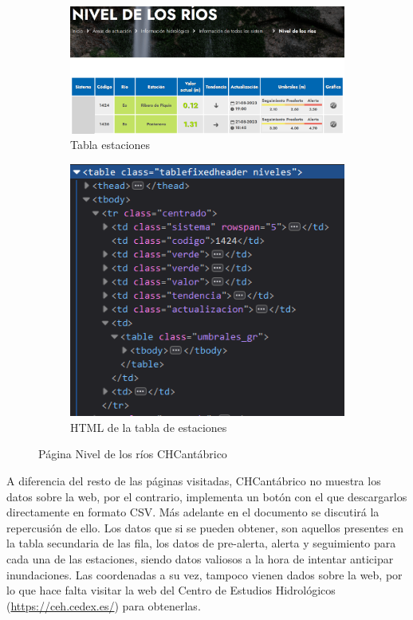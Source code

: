 \begin{figure} [H]
	\centering
	\begin{subfigure}{.5\textwidth}
		\centering
		\includegraphics[width=.7\linewidth]{fig/CHCantabricoCode.png}
		\caption{Tabla estaciones}
		\label{fig:sub9}
	\end{subfigure}%
	\begin{subfigure}{.5\textwidth}
		\centering
		\includegraphics[width=.7\linewidth]{fig/CHCantabricoCodeHTML.png}
		\caption{HTML de la tabla de estaciones}
		\label{fig:sub10}
	\end{subfigure}
	\caption{Página Nivel de los ríos CHCantábrico}
	\label{fig:ej30}
\end{figure}

A diferencia del resto de las páginas visitadas, CHCantábrico no muestra los datos sobre la web, por el contrario, implementa un botón con el que descargarlos directamente en formato CSV. Más adelante en el documento se discutirá la repercusión de ello.\newline
\newline
Los datos que si se pueden obtener, son aquellos presentes en la tabla secundaria de las fila, los datos de pre-alerta, alerta y seguimiento para cada una de las estaciones, siendo datos valiosos a la hora de intentar anticipar inundaciones.\newline
\newline
Las coordenadas a su vez, tampoco vienen dados sobre la web, por lo que hace falta visitar la web del Centro de Estudios Hidrológicos (\url{https://ceh.cedex.es/}) para obtenerlas.